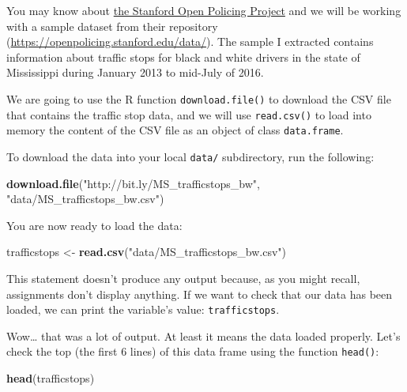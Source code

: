 \documentclass[
]{book}
\newenvironment{Shaded}{\begin{snugshade}}{\end{snugshade}}
\newcommand{\KeywordTok}[1]{\textcolor[rgb]{0.13,0.29,0.53}{\textbf{#1}}}
\newcommand{\NormalTok}[1]{#1}
\newcommand{\StringTok}[1]{\textcolor[rgb]{0.31,0.60,0.02}{#1}}
\begin{document}
You may know about \href{https://openpolicing.stanford.edu}{the Stanford Open Policing Project} and we will be working with a sample dataset from their repository (\url{https://openpolicing.stanford.edu/data/}). The sample I extracted contains information about traffic stops for black and white drivers in the state of Mississippi during January 2013 to mid-July of 2016.

We are going to use the R function \texttt{download.file()} to download the CSV file
that contains the traffic stop data, and we will use \texttt{read.csv()} to
load into memory the content of the CSV file as an object of class \texttt{data.frame}.

To download the data into your local \texttt{data/} subdirectory, run the following:

\begin{Shaded}
\begin{Highlighting}[]
\KeywordTok{download.file}\NormalTok{(}\StringTok{"http://bit.ly/MS_trafficstops_bw"}\NormalTok{, }\StringTok{"data/MS_trafficstops_bw.csv"}\NormalTok{)}
\end{Highlighting}
\end{Shaded}

You are now ready to load the data:

\begin{Shaded}
\begin{Highlighting}[]
\NormalTok{trafficstops <-}\StringTok{ }\KeywordTok{read.csv}\NormalTok{(}\StringTok{"data/MS_trafficstops_bw.csv"}\NormalTok{)}
\end{Highlighting}
\end{Shaded}

This statement doesn't produce any output because, as you might recall,
assignments don't display anything. If we want to check that our data has been
loaded, we can print the variable's value: \texttt{trafficstops}.

Wow\ldots{} that was a lot of output. At least it means the data loaded
properly. Let's check the top (the first 6 lines) of this data frame using the
function \texttt{head()}:

\begin{Shaded}
\begin{Highlighting}[]
\KeywordTok{head}\NormalTok{(trafficstops)}
\end{Highlighting}
\end{Shaded}
\end{document}
